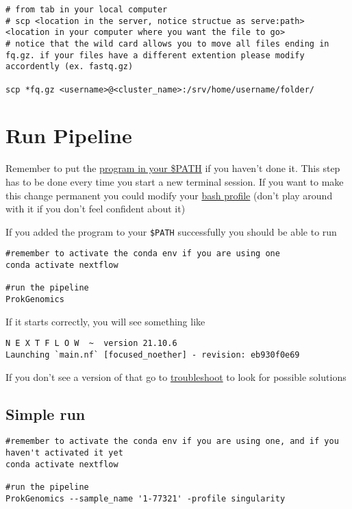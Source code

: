\documentclass[
]{book}
\begin{document}
\begin{verbatim}
# from tab in your local computer
# scp <location in the server, notice structue as serve:path> <location in your computer where you want the file to go>
# notice that the wild card allows you to move all files ending in fq.gz. if your files have a different extention please modify accordently (ex. fastq.gz)

scp *fq.gz <username>@<cluster_name>:/srv/home/username/folder/
\end{verbatim}

\hypertarget{run-pipeline}{%
\chapter{Run Pipeline}\label{run-pipeline}}

Remember to put the \href{getting-started.}{program in your \$PATH} if you haven't done it. This step has to be done every time you start a new terminal session. If you want to make this change permanent you could modify your \href{https://stackoverflow.com/questions/14637979/how-to-permanently-set-path-on-linux-unix}{bash profile} (don't play around with it if you don't feel confident about it)

If you added the program to your \texttt{\$PATH} successfully you should be able to run

\begin{verbatim}
#remember to activate the conda env if you are using one
conda activate nextflow

#run the pipeline
ProkGenomics
\end{verbatim}

If it starts correctly, you will see something like

\begin{verbatim}
N E X T F L O W  ~  version 21.10.6
Launching `main.nf` [focused_noether] - revision: eb930f0e69
\end{verbatim}

If you don't see a version of that go to \href{troubleshooting.html}{troubleshoot} to look for possible solutions

\hypertarget{simple-run}{%
\section{Simple run}\label{simple-run}}

\begin{verbatim}
#remember to activate the conda env if you are using one, and if you haven't activated it yet
conda activate nextflow

#run the pipeline
ProkGenomics --sample_name '1-77321' -profile singularity
\end{verbatim}
\end{document}
